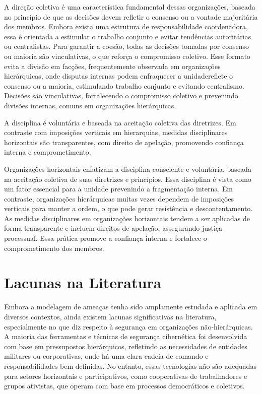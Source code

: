 A direção coletiva é uma característica fundamental dessas organizações,
baseada no princípio de que as decisões devem refletir o consenso ou a vontade
majoritária dos membros. Embora exista uma estrutura de responsabilidade
coordenadora, essa é orientada a estimular o trabalho conjunto e evitar tendências
autoritárias ou centralistas. Para garantir a coesão, todas as decisões tomadas por
consenso ou maioria são vinculativas, o que reforça o compromisso coletivo. Esse
formato evita a divisão em facções, frequentemente observada em organizações
hierárquicas, onde disputas internas podem enfraquecer a unidadereflete o consenso ou a
maioria, estimulando trabalho conjunto e evitando centralismo. Decisões são
vinculativas, fortalecendo o compromisso coletivo e prevenindo divisões internas,
comuns em organizações hierárquicas. 

A disciplina é voluntária e baseada na aceitação coletiva das diretrizes.
Em contraste com imposições verticais em hierarquias, medidas disciplinares
horizontais são transparentes, com direito de apelação, promovendo confiança interna
e comprometimento. 

Organizações horizontais enfatizam a disciplina consciente e voluntária,
baseada na aceitação coletiva de suas diretrizes e princípios. Essa disciplina é
vista como um fator essencial para a unidade prevenindo a fragmentação interna.
Em contraste, organizações hierárquicas muitas vezes dependem de imposições
verticais para manter a ordem, o que pode gerar resistência e descontentamento. As
medidas disciplinares em organizações horizontais tendem a ser aplicadas de forma
transparente e incluem direitos de apelação, assegurando justiça processual. Essa
prática promove a confiança interna e fortalece o comprometimento dos membros. 

\section{Lacunas na Literatura}
\label{sec:introduction}

Embora a modelagem de ameaças tenha sido amplamente estudada e aplicada em
diversos contextos, ainda existem lacunas significativas na literatura, especialmente
no que diz respeito à segurança em organizações não-hierárquicas. A maioria das
ferramentas e técnicas de segurança cibernética foi desenvolvida com base em pressupostos
hierárquicos, refletindo as necessidades de entidades militares ou corporativas, onde há uma
clara cadeia de comando e responsabilidades bem definidas. No entanto, essas
tecnologias não são adequadas para setores horizontais e participativos, como cooperativas
de trabalhadores e grupos ativistas, que operam com base em processos
democráticos e coletivos. 

